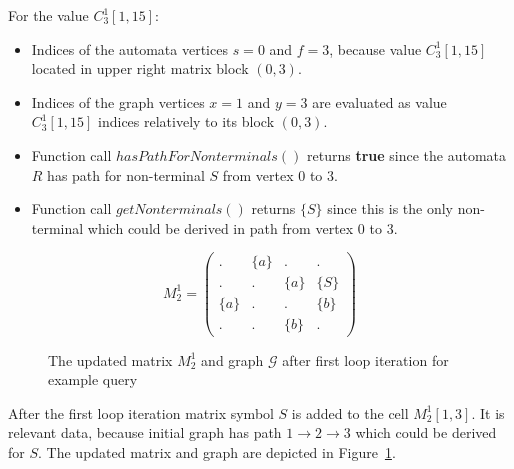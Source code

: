 For the value $C_3^1[1,15]$:
\begin{itemize}
    \item Indices of the automata vertices $s = 0$ and $f = 3$, because value $C_3^1[1,15]$ located in upper right matrix block $(0,3)$.
    \item Indices of the graph vertices $x = 1$ and $y = 3$ are evaluated as
    value $C_3^1[1,15]$ indices relatively to its block $(0,3)$.
    \item Function call $hasPathForNonterminals()$ returns \textbf{true} since the automata $R$ has path for non-terminal $S$ from vertex $0$ to $3$.
    \item Function call $getNonterminals()$ returns $\{S\}$ since this is the only non-terminal which could be derived in path from vertex $0$ to $3$.
\end{itemize}{}

\begin{figure}[h]
    \begin{subfigure}[]{0.5\textwidth}
    \centering
    $$
    M_2^1 =
    \begin{pmatrix}
    . & \{a\} & . & .     \\
    . & . & \{a\} & \{S\} \\
    \{a\} & . & . & \{b\} \\
    . & . & \{b\} & .
    \end{pmatrix}
    $$
    \end{subfigure}
    \begin{subfigure}[]{0.4\textwidth}
    \centering
    \end{subfigure}
    \caption{The updated matrix $M_2^1$ and graph $\mathcal{G}$ after first loop iteration for example query}
    \label{example:iteration1res}
\end{figure}

After the first loop iteration matrix symbol $S$ is added to the cell $M_2^1[1,3]$. It is relevant data, because initial graph has path $1 \to 2 \to 3$ which could be derived for $S$. The updated matrix and graph are depicted in Figure~\ref{example:iteration1res}.

